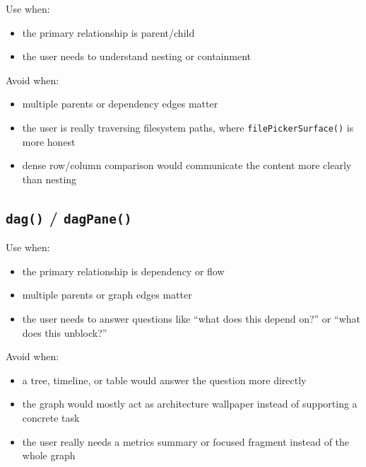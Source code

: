 Use when:

\begin{itemize}
\tightlist
\item
  the primary relationship is parent/child
\item
  the user needs to understand nesting or containment
\end{itemize}

Avoid when:

\begin{itemize}
\tightlist
\item
  multiple parents or dependency edges matter
\item
  the user is really traversing filesystem paths, where \texttt{f\allowbreak{}i\allowbreak{}l\allowbreak{}e\allowbreak{}P\allowbreak{}i\allowbreak{}c\allowbreak{}k\allowbreak{}e\allowbreak{}r\allowbreak{}S\allowbreak{}u\allowbreak{}r\allowbreak{}f\allowbreak{}a\allowbreak{}c\allowbreak{}e\allowbreak{}(\allowbreak{})} is more honest
\item
  dense row/column comparison would communicate the content more clearly than nesting
\end{itemize}

\subsection{\texorpdfstring{\texttt{d\allowbreak{}a\allowbreak{}g\allowbreak{}(\allowbreak{})} / \texttt{d\allowbreak{}a\allowbreak{}g\allowbreak{}P\allowbreak{}a\allowbreak{}n\allowbreak{}e\allowbreak{}(\allowbreak{})}}{ / }}\label{record-023-dag-dagpane}

Use when:

\begin{itemize}
\tightlist
\item
  the primary relationship is dependency or flow
\item
  multiple parents or graph edges matter
\item
  the user needs to answer questions like ``what does this depend on?'' or ``what does this unblock?''
\end{itemize}

Avoid when:

\begin{itemize}
\tightlist
\item
  a tree, timeline, or table would answer the question more directly
\item
  the graph would mostly act as architecture wallpaper instead of supporting a concrete task
\item
  the user really needs a metrics summary or focused fragment instead of the whole graph
\end{itemize}

